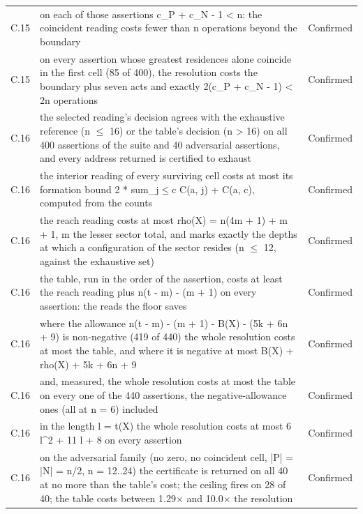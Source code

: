 \documentclass[pdflatex,sn-mathphys-num]{sn-jnl}
\theoremstyle{thmstyleone}%
\theoremstyle{thmstyletwo}%
\theoremstyle{thmstylethree}%
\begin{document}
\begin{appendices}
\begin{longtable}{@{} p{} p{} p{} @{}}
C.15 & on each of those assertions c\_P + c\_N - 1 < n: the coincident reading costs fewer than n operations beyond the boundary & Confirmed \\
C.15 & on every assertion whose greatest residences alone coincide in the first cell (85 of 400), the resolution costs the boundary plus seven acts and exactly 2(c\_P + c\_N - 1) < 2n operations & Confirmed \\
C.16 & the selected reading's decision agrees with the exhaustive reference (n $\le$ 16) or the table's decision (n > 16) on all 400 assertions of the suite and 40 adversarial assertions, and every address returned is certified to exhaust & Confirmed \\
C.16 & the interior reading of every surviving cell costs at most its formation bound 2 * sum\_{j$\le$c} C(a, j) + C(a, c), computed from the counts & Confirmed \\
C.16 & the reach reading costs at most rho(X) = n(4m + 1) + m + 1, m the lesser sector total, and marks exactly the depths at which a configuration of the sector resides (n $\le$ 12, against the exhaustive set) & Confirmed \\
C.16 & the table, run in the order of the assertion, costs at least the reach reading plus n(t - m) - (m + 1) on every assertion: the reads the floor saves & Confirmed \\
C.16 & where the allowance n(t - m) - (m + 1) - B(X) - (5k + 6n + 9) is non-negative (419 of 440) the whole resolution costs at most the table, and where it is negative at most B(X) + rho(X) + 5k + 6n + 9 & Confirmed \\
C.16 & and, measured, the whole resolution costs at most the table on every one of the 440 assertions, the negative-allowance ones (all at n = 6) included & Confirmed \\
C.16 & in the length l = t(X) the whole resolution costs at most 6 l\^{}2 + 11 l + 8 on every assertion & Confirmed \\
C.16 & on the adversarial family (no zero, no coincident cell, |P| = |N| = n/2, n = 12..24) the certificate is returned on all 40 at no more than the table's cost; the ceiling fires on 28 of 40; the table costs between 1.29$\times$ and 10.0$\times$ the resolution & Confirmed \\
\end{longtable}\endgroup


\end{appendices}
\end{document}
